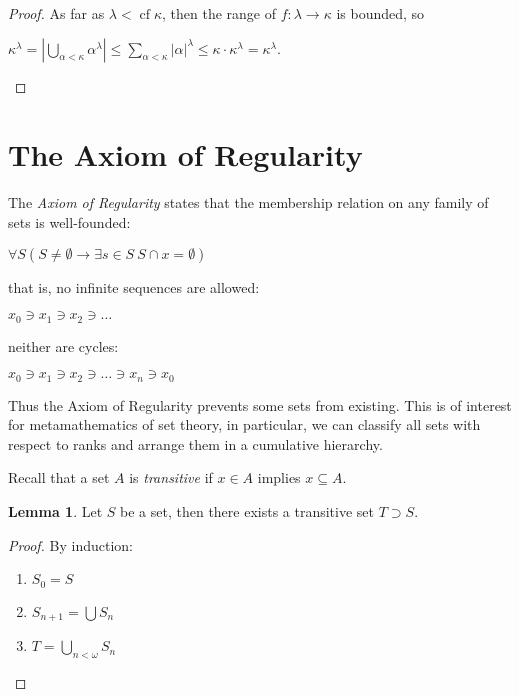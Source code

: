 \documentclass[8pt]{article}
\theoremstyle{definition}
\theoremstyle{definition}
\theoremstyle{definition}
\theoremstyle{definition}
\theoremstyle{definition}
\theoremstyle{definition}
\theoremstyle{definition}
\theoremstyle{definition}
\newtheorem{lemma}{Lemma}[section]
\theoremstyle{definition}
\theoremstyle{definition}
\theoremstyle{definition}
\theoremstyle{definition}
\theoremstyle{definition}
\theoremstyle{definition}
\theoremstyle{question}
\begin{document}
\begin{proof}
 
As far as $\lambda < \operatorname{cf} \kappa$, then the range of $f : \lambda \to \kappa$ is bounded, so
\begin{center}
$\kappa^{\lambda} = | \bigcup \limits_{\alpha < \kappa} \alpha^{\lambda}| \leq \sum \limits_{\alpha < \kappa} |\alpha|^{\lambda} \leq \kappa \cdot \kappa^{\lambda} = \kappa^{\lambda}$.
\end{center}
\end{proof}

\section{The Axiom of Regularity}

The \emph{Axiom of Regularity} states that the membership relation on any family of sets is well-founded:
\begin{center}
  $\forall S (S \neq \emptyset \to \exists s \in S \: S \cap x = \emptyset)$
\end{center}
that is, no infinite sequences are allowed:
\begin{center}
  $x_0 \ni x_1 \ni x_2 \ni \dots$
\end{center}
neither are cycles:
\begin{center}
  $x_0 \ni x_1 \ni x_2 \ni \dots \ni x_n \ni x_0$
\end{center}

Thus the Axiom of Regularity prevents some sets from existing. This is of interest for metamathematics of set theory, in
particular, we can classify all sets with respect to ranks and arrange them in a cumulative hierarchy.

Recall that a set $A$ is \emph{transitive} if $x \in A$ implies $x \subseteq A$.

\begin{lemma}
  Let $S$ be a set, then there exists a transitive set $T \supset S$.
\end{lemma}
\begin{proof}
  By induction:

  \begin{enumerate}
    \item $S_0 = S$
    \item $S_{n + 1} = \bigcup S_n$
    \item $T = \bigcup \limits_{n < \omega} S_n$
  \end{enumerate}
\end{proof}
\end{document}
